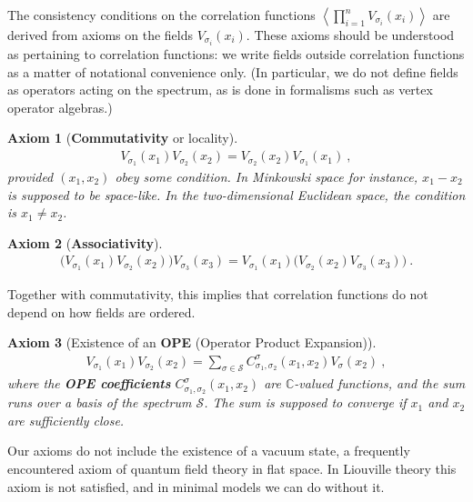 \documentclass[12pt, a4paper, notitlepage, twoside]{report}
\numberwithin{equation}{section}
\theoremstyle{break}
\newtheorem{hyp}{Axiom}[chapter]
\begin{document}
The consistency conditions on the correlation functions $\left\langle\prod_{i=1}^n V_{\sigma_i}(x_i)\right\rangle$ are derived from axioms on the fields $V_{\sigma_i}(x_i)$. These axioms should be understood as pertaining to correlation functions: we write fields outside correlation functions as a matter of notational convenience only. (In particular, we do not define fields as operators acting on the spectrum, as is done in formalisms such as vertex operator algebras.) 

\begin{hyp}[\textbf{Commutativity} or locality]
\label{ax:col}
\begin{align}
 \boxed{V_{\sigma_1}(x_1)V_{\sigma_2}(x_2) = V_{\sigma_2}(x_2) V_{\sigma_1}(x_1)}\ ,
\label{comm}
\end{align}
provided $(x_1,x_2)$ obey some condition.
In Minkowski space for instance, $x_1-x_2$ is supposed to be space-like.
In the two-dimensional Euclidean space, the condition is $x_1\neq x_2$.
\end{hyp}
\begin{hyp}[\textbf{Associativity}]
\label{ax:ass}
\begin{align}
 \boxed{\Big(V_{\sigma_1}(x_1)V_{\sigma_2}(x_2)\Big) V_{\sigma_3}(x_3) = V_{\sigma_1}(x_1)  \Big(V_{\sigma_2}(x_2) V_{\sigma_3}(x_3)\Big)}\ .
\label{asso}
\end{align}
\end{hyp} 
\noindent
Together with commutativity, this implies that correlation functions do not depend on how fields are ordered.
\begin{hyp}[Existence of an \textbf{\boldmath OPE} (Operator Product Expansion)]
 \label{ax:ope}
 \begin{align}
 \boxed{V_{\sigma_1}(x_1)V_{\sigma_2}(x_2) = \sum_{\sigma\in \mathcal{S}} C_{\sigma_1,\sigma_2}^{\sigma}(x_1,x_2) V_{\sigma}(x_2)}\ ,
\label{ope}
\end{align}
where the \textbf{\boldmath OPE coefficients} $C_{\sigma_1,\sigma_2}^{\sigma}(x_1,x_2)$ are $\mathbb{C}$-valued functions, and the sum runs over a basis of the spectrum $\mathcal{S}$. 
The sum is supposed to converge if $x_1$ and $x_2$ are sufficiently close. 
\end{hyp} 
\noindent
Our axioms do not include the existence of a vacuum state, a frequently encountered axiom of quantum field theory in flat space.
In Liouville theory this axiom is not satisfied, and in minimal models we can do without it. 
\end{document}
